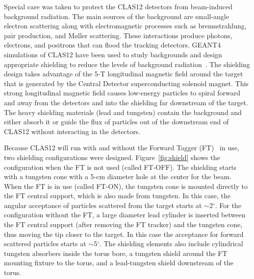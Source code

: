 Special care was taken to protect the CLAS12 detectors from beam-induced background radiation. The main sources
of the background are small-angle electron scattering along with electromagnetic processes such as bremsstrahlung,
pair production, and M{\o}ller scattering. These interactions produce photons, electrons, and positrons that can flood
the tracking detectors. GEANT4 simulations of CLAS12 have been used to study backgrounds and design appropriate
shielding to reduce the levels of background radiation~\cite{sim-nim}. The shielding design takes advantage of the
5-T longitudinal magnetic field around the target that is generated by the Central Detector superconducting solenoid
magnet. This strong longitudinal magnetic field causes low-energy particles to spiral forward and away from the
detectors and into the shielding far downstream of the target. The heavy shielding materials (lead and tungsten)
contain the background and either absorb it or guide the flux of particles out of the downstream end of CLAS12
without interacting in the detectors. 

Because CLAS12 will run with and without the Forward Tagger (FT)~\cite{ft-nim} in use, two shielding configurations
were designed. Figure~\ref{fig:shield} shows the configuration when the FT is not used (called FT-OFF). The
shielding starts with a tungsten cone with a 5-cm diameter hole at the center for the beam. When the FT is in use
(called FT-ON), the tungsten cone is mounted directly to the FT central support, which is also made from tungsten.
In this case, the angular acceptance of particles scattered from the target starts at $\sim$2$^\circ$. For the
configuration without the FT, a large diameter lead cylinder is inserted between the FT central support (after
removing the FT tracker) and the tungsten cone, thus moving the tip closer to the target. In this case the
acceptance for forward scattered particles starts at $\sim$5$^\circ$. The shielding elements also include
cylindrical tungsten absorbers inside the torus bore, a tungsten shield around the FT mounting fixture to the torus,
and a lead-tungsten shield downstream of the torus.  

